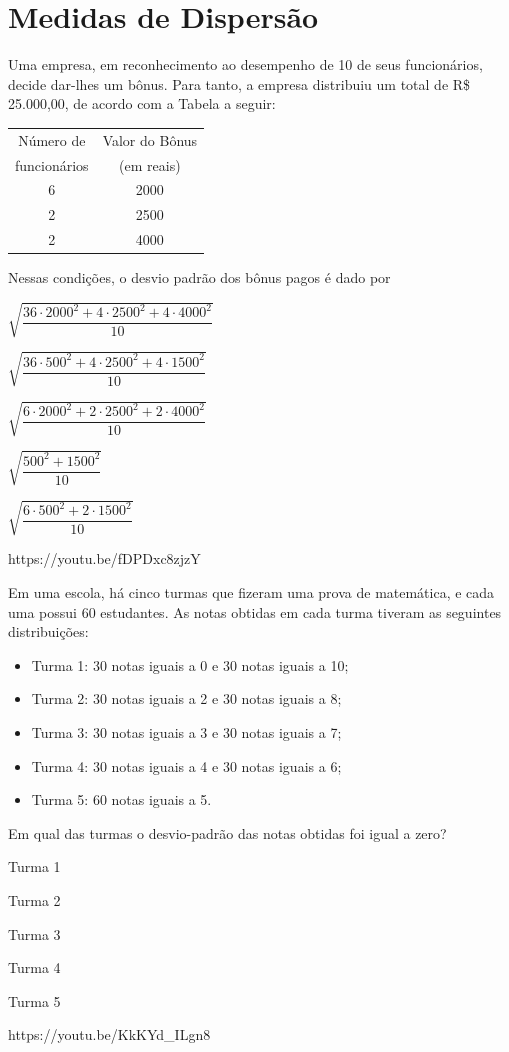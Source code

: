 \section{Medidas de Dispersão}

{Uma empresa, em reconhecimento ao desempenho de 10 de seus funcionários, decide dar-lhes um bônus. Para tanto, a empresa distribuiu um total de R\$ 25.000,00, de acordo com a Tabela a seguir:
\begin{center}
\begin{tabular}{c|c}
\hline 
Número de   & Valor do Bônus\\ 
funcionários & (em reais) \\ 
\hline
6 & 2000 \\ 
\hline 
2 & 2500 \\ 
\hline 
2 & 4000 \\ 
\hline 
\end{tabular} 
\end{center}
Nessas condições, o desvio padrão dos bônus pagos é dado por}
{
\item $\sqrt{\dfrac{36 \cdot 2000^2 + 4\cdot 2500^2 + 4\cdot 4000^2}{10}}$
\item $\sqrt{\dfrac{36 \cdot 500^2 + 4\cdot 2500^2 + 4\cdot 1500^2}{10}}$
\item $\sqrt{\dfrac{6 \cdot 2000^2 + 2\cdot 2500^2 + 2\cdot 4000^2}{10}}$
\item $\sqrt{\dfrac{500^2 + 1500^2}{10}}$
\item $\sqrt{\dfrac{6 \cdot 500^2 + 2\cdot 1500^2}{10}}$
}
{https://youtu.be/fDPDxc8zjzY}

{Em uma escola, há cinco turmas que fizeram uma prova de matemática, e cada uma possui 60 estudantes. As notas obtidas em cada turma tiveram as seguintes distribuições:
\begin{itemize}
\item Turma 1: 30 notas iguais a 0 e 30 notas iguais a 10;
\item Turma 2: 30 notas iguais a 2 e 30 notas iguais a 8;
\item Turma 3: 30 notas iguais a 3 e 30 notas iguais a 7;
\item Turma 4: 30 notas iguais a 4 e 30 notas iguais a 6;
\item Turma 5: 60 notas iguais a 5.
\end{itemize}
Em qual das turmas o desvio-padrão das notas obtidas foi igual a zero?}
{
\item Turma 1
\item Turma 2
\item Turma 3
\item Turma 4
\item Turma 5}
{https://youtu.be/KkKYd_ILgn8}